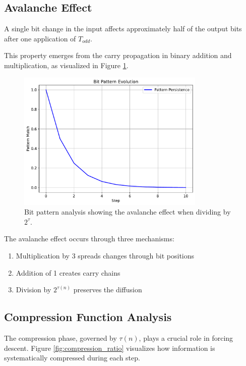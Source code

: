 \subsection{Avalanche Effect}

\begin{theorem}\label{thm:avalanche}
A single bit change in the input affects approximately half of the output bits after one application of $T_{odd}$.
\end{theorem}

This property emerges from the carry propagation in binary addition and multiplication, as visualized in Figure \ref{fig:bit_patterns}.

\begin{figure}[h]
\centering
\includegraphics[width=0.8\textwidth]{py_visuals/figures/bit_patterns.pdf}
\caption{Bit pattern analysis showing the avalanche effect when dividing by $2^\tau$.}
\label{fig:bit_patterns}
\end{figure}

The avalanche effect occurs through three mechanisms:
\begin{enumerate}
\item Multiplication by 3 spreads changes through bit positions
\item Addition of 1 creates carry chains
\item Division by $2^{\tau(n)}$ preserves the diffusion
\end{enumerate}

\subsection{Compression Function Analysis}

The compression phase, governed by $\tau(n)$, plays a crucial role in forcing descent. Figure \ref{fig:compression_ratio} visualizes how information is systematically compressed during each step.

